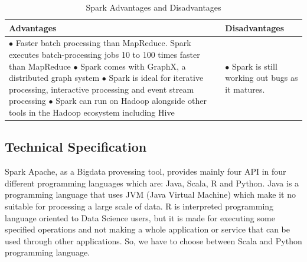 \begin{table}[H]
\caption{Spark Advantages and Disadvantages}
\begin{center}
\begin{tabularx}{17cm}{ |p{8.5cm}|X| } 
 \hline
 \textbf{Advantages} & \textbf{Disadvantages}  \\ \hline
 $\bullet$ Faster batch processing than MapReduce. Spark executes batch-processing jobs 10 to 100 times faster than MapReduce \newline $\bullet$ Spark comes with GraphX, a distributed graph system \newline $\bullet$ Spark is ideal for iterative processing, interactive processing and event stream processing \newline $\bullet$ Spark can run on Hadoop alongside other tools in the Hadoop ecosystem including Hive & $\bullet$ Spark is still working out bugs as it matures.\\ \hline

\end{tabularx}
\end{center}
\end{table}
\subsection{Technical Specification}
Spark Apache, as a Bigdata provessing tool, provides mainly four API in four different programming languages which are: Java, Scala, R and Python. Java is a programming language that uses JVM (Java Virtual Machine) which make it no suitable for processing a large scale of data. R is interpreted programming language oriented to Data Science users, but it is made for executing some specified operations and not making a whole application or service that can be used through other applications. So, we have to choose between Scala and Python programming language.\\

